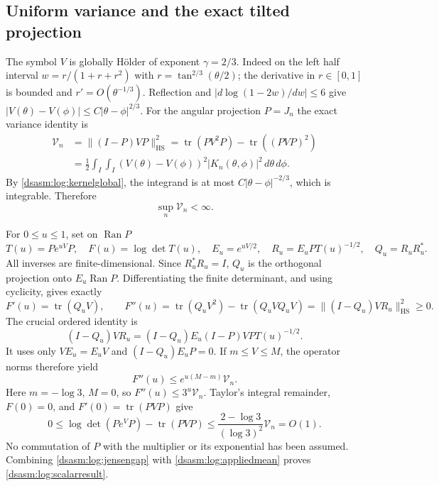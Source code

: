 \documentclass[11pt,letterpaper]{article}
\theoremstyle{remark}\newtheorem{remark}[theorem]{Remark}
\newcommand{\HS}{\mathrm{HS}}
\DeclareMathOperator{\tr}{tr}\DeclareMathOperator{\Ran}{Ran}
\begin{document}
\subsection{Uniform variance and the exact tilted projection}
The symbol $V$ is globally H\"older of exponent $\gamma=2/3$.
Indeed on the left half interval $w=r/(1+r+r^2)$ with
$r=\tan^{2/3}(\theta/2)$; the derivative in $r\in[0,1]$ is bounded
and $r'=O(\theta^{-1/3})$. Reflection and
$|d\log(1-2w)/dw|\le6$ give
$|V(\theta)-V(\phi)|\le C|\theta-\phi|^{2/3}$.
For the angular projection $P=J_n$ the exact variance identity is
\begin{equation}\label{dsasm:log:varianceidentity}
\begin{split}
 \mathcal V_n&=\|(I-P)VP\|_\HS^2
 =\tr(PV^2P)-\tr((PVP)^2)\\
 &=\frac12\int_I\int_I
  (V(\theta)-V(\phi))^2|K_n(\theta,\phi)|^2\,d\theta\,d\phi.
\end{split}
\end{equation}
By \eqref{dsasm:log:kernelglobal}, the integrand is at most
$C|\theta-\phi|^{-2/3}$, which is integrable. Therefore
\begin{equation}\label{dsasm:log:variancebound}
 \sup_n\mathcal V_n<\infty.
\end{equation}

For $0\le u\le1$, set on $\Ran P$
\[
 T(u)=Pe^{uV}P,\quad F(u)=\log\det T(u),\quad
 E_u=e^{uV/2},\quad R_u=E_uP T(u)^{-1/2},\quad Q_u=R_uR_u^*.
\]
All inverses are finite-dimensional. Since $R_u^*R_u=I$, $Q_u$
is the orthogonal projection onto $E_u\Ran P$. Differentiating the
finite determinant, and using cyclicity, gives exactly
\begin{equation}\label{dsasm:log:tiltidentity}
 F'(u)=\tr(Q_uV),\qquad
 F''(u)=\tr(Q_uV^2)-\tr(Q_uVQ_uV)
       =\|(I-Q_u)VR_u\|_\HS^2\ge0.
\end{equation}
The crucial ordered identity is
\[
 (I-Q_u)VR_u=(I-Q_u)E_u(I-P)VP T(u)^{-1/2}.
\]
It uses only $VE_u=E_uV$ and $(I-Q_u)E_uP=0$.
If $m\le V\le M$, the operator norms therefore yield
\[
 F''(u)\le e^{u(M-m)}\mathcal V_n.
\]
Here $m=-\log3$, $M=0$, so $F''(u)\le3^u\mathcal V_n$.
Taylor's integral remainder, $F(0)=0$, and $F'(0)=\tr(PVP)$ give
\begin{equation}\label{dsasm:log:jensengap}
 0\le\log\det(Pe^VP)-\tr(PVP)
 \le\frac{2-\log3}{(\log3)^2}\mathcal V_n=O(1).
\end{equation}
No commutation of $P$ with the multiplier or its exponential has
been assumed. Combining \eqref{dsasm:log:jensengap} with \eqref{dsasm:log:appliedmean}
proves \eqref{dsasm:log:scalarresult}.
\end{document}
